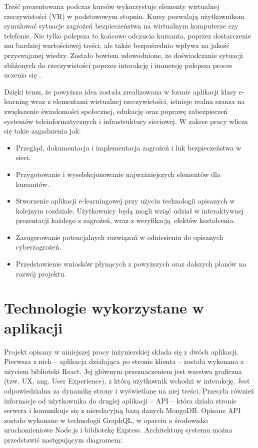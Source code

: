 \documentclass[12pt,twoside]{article}
\begin{document}
Treść prezentowana podczas kursów wykorzystuje elementy wirtualnej rzeczywistości (VR) w podstawowym stopniu. Kursy pozwalają użytkownikom symulować sytuacje zagrożeń bezpieczeństwa na wirtualnym komputerze czy telefonie. Nie tylko polepsza to końcowe odczucia kursanta, poprzez dostarczenie mu bardziej wartościowej treści, ale także bezpośrednio wpływa na jakość przyswajanej wiedzy. Zostało bowiem udowodnione, że doświadczanie sytuacji zbliżonych do rzeczywistości poprzez interakcję i immersję polepsza proces uczenia się \cite{VrLearning}. 

Dzięki temu, że powyższa idea została zrealizowana w formie aplikacji klasy e-learning wraz z elementami wirtualnej rzeczywistości, istnieje realna szansa na zwiększenie świadomości społecznej, edukację oraz poprawę zabezpieczeń systemów teleinformatycznych i infrastruktury sieciowej. W zakres pracy wlicza się takie zagadnienia jak:
\begin{itemize}
\item Przegląd, dokumentacja i implementacja zagrożeń i luk bezpieczeństwa w sieci. 
\item Przygotowanie i wyselekcjonowanie najważniejszych elementów dla kursantów.
\item Stworzenie aplikacji e-learningowej przy użyciu technologii opisanych w kolejnym rozdziale. Użytkownicy będą mogli wziąć udział w interaktywnej prezentacji każdego z zagrożeń, wraz z weryfikacją efektów kształcenia.
\item Zasugerowanie potencjalnych rozwiązań w odniesieniu do opisanych cyberzagrożeń.
\item Przedstawienie wniosków płynących z powyższych oraz dalszych planów na rozwój projektu.\\
\end{itemize} 

\clearpage

\section{Technologie wykorzystane w aplikacji}

Projekt opisany w niniejszej pracy inżynierskiej składa się z dwóch aplikacji. Pierwsza z nich -- aplikacja działająca po stronie klienta -- została wykonana z użyciem biblioteki React. Jej głównym przeznaczeniem jest warstwa graficzna (tzw. UX, ang. User Experience), z którą użytkownik wchodzi w interakcję. Jest odpowiedzialna za dynamikę strony i wyświetlane na niej treści. Przesyła również informacje od użytkownika do drugiej aplikacji -- API -- która działa stronie serwera i komunikuje się z nierelacyjną bazą danych MongoDB. Opisane API zostało wykonane w technologii GraphQL, w oparciu o środowisko uruchomieniowe Node.js i bibliotekę Express. Architekturę systemu można przedstawić następującym diagramem:
\end{document}
